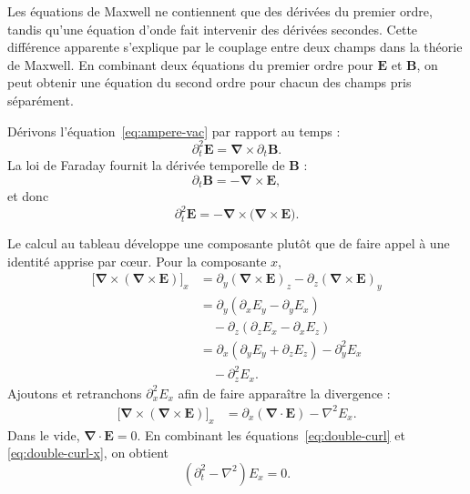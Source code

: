 Les équations de Maxwell ne contiennent que des dérivées du premier ordre, tandis qu’une équation d’onde fait intervenir des dérivées secondes. Cette différence apparente s’explique par le couplage entre deux champs dans la théorie de Maxwell. En combinant deux équations du premier ordre pour \(\mathbf E\) et \(\mathbf B\), on peut obtenir une équation du second ordre pour chacun des champs pris séparément.

Dérivons l’équation~\eqref{eq:ampere-vac} par rapport au temps :
\begin{equation}
\partial_t^2\mathbf E
=\boldsymbol\nabla\times\partial_t\mathbf B.
\end{equation}
La loi de Faraday fournit la dérivée temporelle de \(\mathbf B\) :
\begin{equation}
\partial_t\mathbf B=-\boldsymbol\nabla\times\mathbf E,
\end{equation}
et donc
\begin{equation}
\partial_t^2\mathbf E
=-\boldsymbol\nabla\times
  \bigl(\boldsymbol\nabla\times\mathbf E\bigr).
\label{eq:double-curl}
\end{equation}

Le calcul au tableau développe une composante plutôt que de faire appel à une identité apprise par cœur. Pour la composante \(x\),
\begin{align}
\bigl[\boldsymbol\nabla\times
(\boldsymbol\nabla\times\mathbf E)\bigr]_x
&=\partial_y(\boldsymbol\nabla\times\mathbf E)_z
 -\partial_z(\boldsymbol\nabla\times\mathbf E)_y\\
&=\partial_y(\partial_xE_y-\partial_yE_x)\\
&\quad-\partial_z(\partial_zE_x-\partial_xE_z)\\
&=\partial_x(\partial_yE_y+\partial_zE_z)
 -\partial_y^2E_x\\
&\quad-\partial_z^2E_x.
\end{align}
Ajoutons et retranchons \(\partial_x^2E_x\) afin de faire apparaître la divergence :
\begin{align}
\bigl[\boldsymbol\nabla\times
(\boldsymbol\nabla\times\mathbf E)\bigr]_x
&=\partial_x(\boldsymbol\nabla\cdot\mathbf E)
 -\nabla^2E_x.
\label{eq:double-curl-x}
\end{align}
Dans le vide, \(\boldsymbol\nabla\cdot\mathbf E=0\). En combinant les équations~\eqref{eq:double-curl} et \eqref{eq:double-curl-x}, on obtient
\begin{equation}
\left(\partial_t^2-\nabla^2\right)E_x=0.
\label{eq:ex-wave}
\end{equation}

